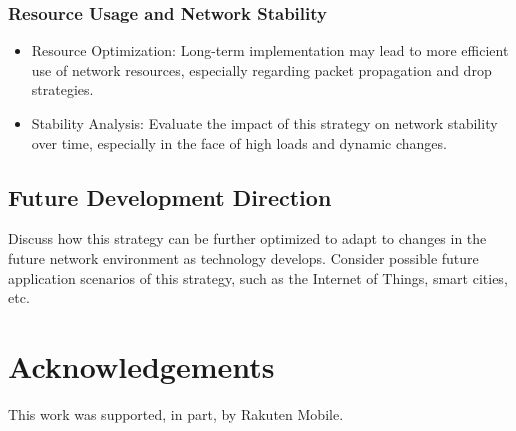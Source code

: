 \documentclass[10pt,conference]{IEEEtran}
\begin{document}
\subsubsection{Resource Usage and Network Stability}
\begin{itemize}
    \item Resource Optimization: Long-term implementation may lead to more efficient use of network resources, especially regarding packet propagation and drop strategies.
    \item Stability Analysis: Evaluate the impact of this strategy on network stability over time, especially in the face of high loads and dynamic changes.
\end{itemize}

\subsection{Future Development Direction}
Discuss how this strategy can be further optimized to adapt to changes in the future network environment as technology develops. Consider possible future application scenarios of this strategy, such as the Internet of Things, smart cities, etc.


\section*{Acknowledgements}

This work was supported, in part, by Rakuten Mobile.



\end{document}
